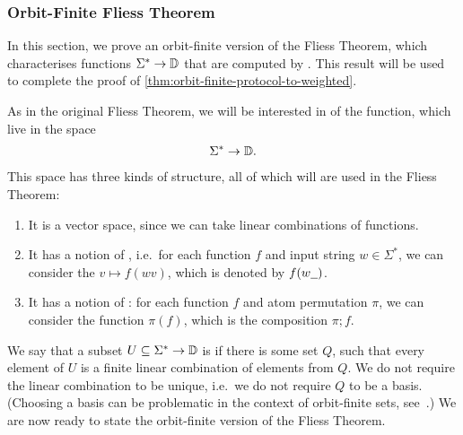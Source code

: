 \subsubsection{Orbit-Finite Fliess Theorem}
In this section, we prove an orbit-finite version of the Fliess Theorem, which characterises functions $\Sigma^* \to \mathbb D$ that are computed by . 
This result will be used to complete the proof of \cref{thm:orbit-finite-protocol-to-weighted}.

As in the original Fliess Theorem, we will be interested in  of the function,
which live in the space  
\begin{align*}
\Sigma^* \to \mathbb D.
\end{align*}
This space has three kinds of structure, all of which will are used in the Fliess Theorem: 
\begin{enumerate}
    \item It is a vector space, since we can take linear combinations of functions.
    \item It has a notion of , i.e.~for each function $f$ and input string $w \in \Sigma^*$, we can consider the  $v \mapsto f(wv)$, which is denoted by $f(w\underline{\hspace{2mm}})$.
    \item It has a notion of : for each function $f$ and atom permutation $\pi$, we can consider the function $\pi(f)$, which is the composition $\pi;f$.
\end{enumerate}

\AP
We say that a subset  $U \subseteq \Sigma^* \to \mathbb D$  is
 if there is some  set $Q$, such that
every element of $U$ is a finite linear combination of elements from $Q$. We do
not require the linear combination to be unique, i.e.~we do not require $Q$ to
be a basis. (Choosing a basis can be problematic in the context of orbit-finite
sets, see~\cite[Example 77]{bojanczyk_slightly}.) We are now ready to state the
orbit-finite version of the Fliess Theorem.

